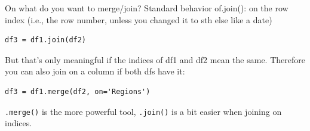 \documentclass{beamer}
\begin{document}
{
	\begin{frame}[plain]
\end{frame}
	\begin{frame}[plain]
\end{frame}
}

\begin{frame}[fragile]{On what do you want to merge/join?}
Standard behavior of.join(): on the row index  (i.e., the row number, unless
you changed it to sth else like a date)
\begin{lstlisting}
df3 = df1.join(df2)
\end{lstlisting}
\pause
But that’s only meaningful if the indices of df1 and df2 mean the same. Therefore you can also join on a column if both dfs have it:
\begin{lstlisting}
df3 = df1.merge(df2, on='Regions')
\end{lstlisting}
\pause
\texttt{.merge()} is the more powerful tool, \texttt{.join()} is a bit easier when joining on indices.
\end{frame}
\end{document}
